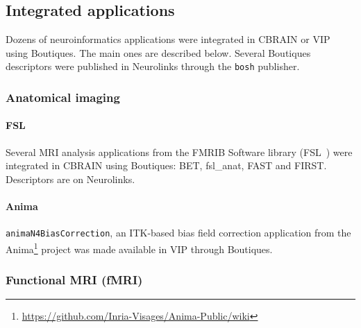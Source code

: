 \documentclass[a4paper,num-refs]{oup-contemporary}
\newcommand{\boutiques}{Boutiques\xspace}
\begin{document}
\subsection{Integrated applications}



Dozens of neuroinformatics applications were integrated in CBRAIN or
VIP using \boutiques. The main ones are described below. Several
\boutiques descriptors were published in Neurolinks through the
\texttt{bosh} publisher.




\subsubsection{Anatomical imaging}

\paragraph{FSL} Several MRI analysis applications from the FMRIB Software
library (FSL~\cite{jenkinson2012fsl}) were integrated in CBRAIN using
\boutiques: BET, fsl\_anat, FAST and FIRST. Descriptors are
on Neurolinks.

\paragraph{Anima}
\texttt{animaN4BiasCorrection}, an ITK-based bias field correction application from the
Anima\footnote{\url{https://github.com/Inria-Visages/Anima-Public/wiki}}
project was made available in VIP through \boutiques. 

\subsubsection{Functional MRI (fMRI)}
\end{document}
